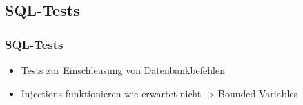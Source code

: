 \subsection*{SQL-Tests}

\begin{frame}\frametitle{SQL-Tests}
    \begin{itemize} 
        \item Tests zur Einschleusung von Datenbankbefehlen
        \item Injections funktionieren wie erwartet nicht -> Bounded Variables
    \end{itemize}
        
\end{frame}
